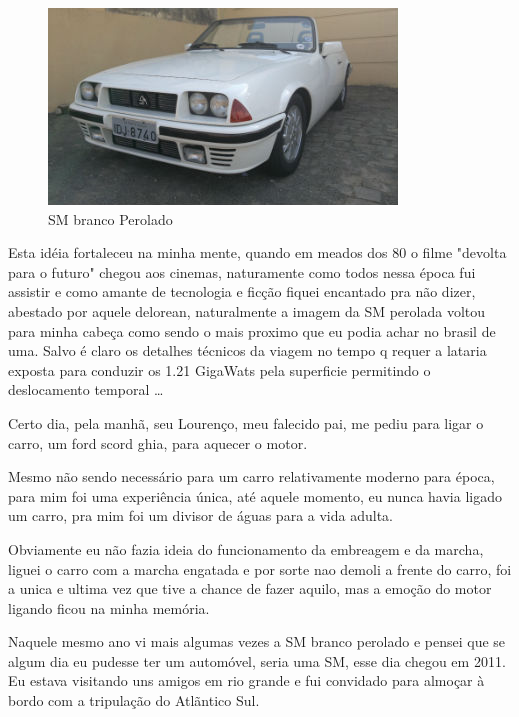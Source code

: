 \documentclass[a4paper]{report}
\begin{document}
\begin{figure}[!htb]
\centering
\includegraphics{sm_bco_per}
\caption{SM branco Perolado}
\label{sm_bco}
\end{figure}

Esta id\'eia fortaleceu na minha mente, quando em meados dos 80 o filme "devolta para o futuro" chegou aos cinemas, naturamente como todos nessa \'epoca
fui assistir e como amante de tecnologia e fic\c{c}\~ao fiquei encantado pra n\~ao dizer, abestado por aquele delorean, naturalmente a imagem da SM perolada
voltou para minha cabe\c{c}a como sendo o mais proximo que eu podia achar no brasil de uma. Salvo \'e claro os detalhes t\'ecnicos da viagem no tempo q requer
a lataria exposta para conduzir os 1.21 GigaWats pela superficie permitindo o deslocamento temporal \dots

Certo dia, pela manh\~a, seu Louren\c{c}o, meu falecido pai, me pediu para ligar o carro, um ford scord ghia, para aquecer o motor.

Mesmo n\~ao sendo necess\'ario para um carro relativamente moderno para \'epoca, para mim foi uma experi\^encia \'unica,
at\'e aquele momento, eu nunca havia ligado um carro, pra mim foi um divisor de \'aguas para a vida adulta.

Obviamente eu n\~ao fazia ideia do funcionamento da embreagem e da marcha, liguei o carro com a marcha engatada e por sorte
nao demoli a frente do carro, foi a unica e ultima vez que tive a chance de fazer aquilo, mas a emo\c{c}\~ao do motor ligando ficou
na minha mem\'oria. 

Naquele mesmo ano vi mais algumas vezes a SM branco perolado e pensei que se algum dia eu pudesse ter um
autom\'ovel, seria uma SM, esse dia chegou em 2011.
\clearpage
Eu estava visitando uns amigos em rio grande e fui convidado para almo\c{c}ar \`a bordo com a tripula\c{c}\~ao do Atl\~antico Sul.
\end{document}
